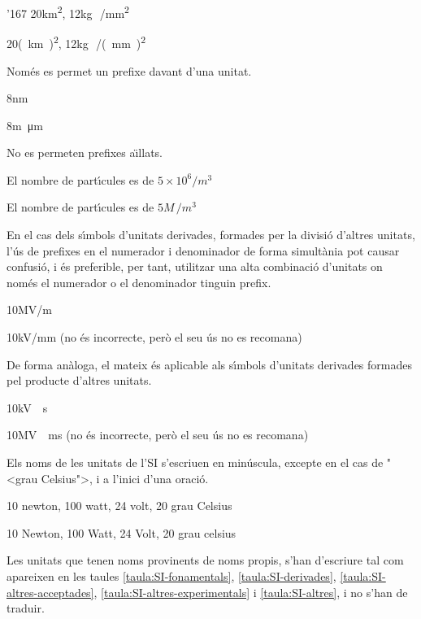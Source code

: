 \begin{dinglist}{'167}
\textcolor{Green}{} 20\unit{km^2}, 12\unit{kg\,/mm^2}

\textcolor{Red}{} 20\unit{(km)^2}, 12\unit{kg\,/(mm)^2}

\item Nom\'{e}s es permet un prefixe davant d'una unitat.

\textcolor{Green}{} 8\unit{nm}

\textcolor{Red}{} 8\unit{m\micro m}

\item No es permeten prefixes a\"{\i}llats.

\textcolor{Green}{} El nombre de part\'{\i}cules es de $5\times 10^6 /\unit{m^3}$

\textcolor{Red}{} El nombre de part\'{\i}cules es de $5 \unit{M\,/m^3}$

\item En el cas dels s\'{\i}mbols d'unitats derivades, formades per la divisi\'{o}
d'altres unitats, l'\'{u}s de prefixes en el numerador i denominador de
forma simult\`{a}nia pot causar confusi\'{o}, i \'{e}s preferible, per tant,
utilitzar una alta combinaci\'{o} d'unitats on nom\'{e}s el numerador o el
denominador tinguin prefix.

\textcolor{Green}{} 10\unit{MV/m}

\textcolor{Red}{}  10\unit{kV/mm}  (no \'{e}s incorrecte, per\`{o} el seu \'{u}s no es recomana)

\item De forma an\`{a}loga, el mateix \'{e}s aplicable als s\'{\i}mbols d'unitats
derivades formades pel producte d'altres unitats.

\textcolor{Green}{} 10\unit{kV\cdot s}

\textcolor{Red}{}  10\unit{MV\cdot ms}  (no \'{e}s incorrecte, per\`{o} el seu \'{u}s no es recomana)

\item Els noms de les unitats de l'SI s'escriuen en min\'{u}scula, excepte en
el cas de {"<}grau Celsius{">}, i a l'inici d'una oraci\'{o}.

\textcolor{Green}{} 10 newton, 100 watt, 24 volt, 20 grau Celsius

\textcolor{Red}{} 10 Newton, 100 Watt, 24 Volt, 20 grau celsius

\item Les unitats que tenen noms provinents de noms propis, s'han
d'escriure tal com apareixen en les taules
\vref{taula:SI-fonamentals}, \vref{taula:SI-derivades}, \vref{taula:SI-altres-acceptades}, \vref{taula:SI-altres-experimentals} i \vref{taula:SI-altres}, i no s'han
de traduir.


\end{dinglist}
